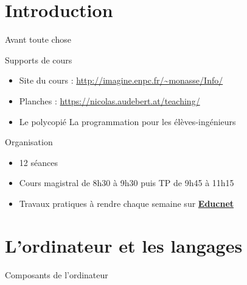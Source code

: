 
\subtitle{Préliminaires}
\date{14 septembre 2018}
\maketitle

\section{Introduction}

\begin{frame}{Avant toute chose}
  \begin{block}{Supports de cours}
  \begin{itemize}
    \item Site du cours : {\small \url{http://imagine.enpc.fr/~monasse/Info/}}\\
  	\item Planches : {\small \url{https://nicolas.audebert.at/teaching/}}
  	\item Le polycopié \og La programmation pour les élèves-ingénieurs \fg
  \end{itemize}
  \end{block}

  \begin{block}{Organisation}
    \begin{itemize}
        \item 12 séances
      	\item Cours magistral de 8h30 à 9h30 puis TP de 9h45 à 11h15
        \item Travaux pratiques à rendre chaque semaine sur \href{https://educnet.enpc.fr}{\textbf{Educnet}}
    \end{itemize}
  \end{block}

\end{frame}


\section{L'ordinateur et les langages}

\begin{frame}{Composants de l'ordinateur}
	\centering
	\def\imagefolder{./images/}
	\resizebox{\textwidth}{!}{}
\end{frame}

